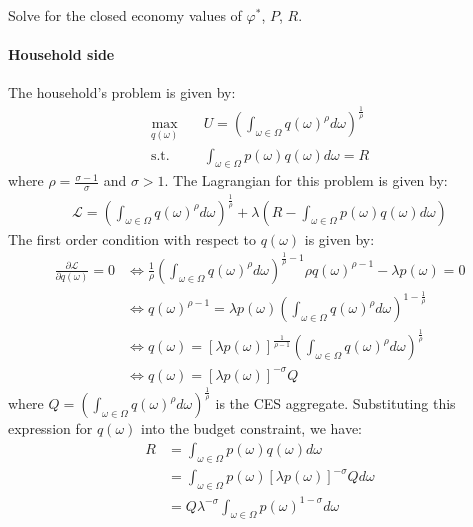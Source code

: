 Solve for the closed economy values of $\varphi^*$, $P$, $R$.

\begin{solution} \paragraph{Household side} The household's problem is given by:
    \begin{align*}
        \max_{q(\omega)} \quad & U = \left( \int_{\omega \in \Omega} q(\omega)^{\rho} d\omega \right)^{\frac{1}{\rho}} \\
        \text{s.t.} \quad & \int_{\omega \in \Omega} p(\omega) q(\omega) d\omega = R
    \end{align*}
    where $\rho = \frac{\sigma - 1}{\sigma}$ and $\sigma > 1$. The Lagrangian for this problem is given by:
    \begin{align*}
        \mathcal{L} = \left( \int_{\omega \in \Omega} q(\omega)^{\rho} d\omega \right)^{\frac{1}{\rho}} + \lambda \left( R - \int_{\omega \in \Omega} p(\omega) q(\omega) d\omega \right)
    \end{align*}
    The first order condition with respect to $q(\omega)$ is given by:
    \begin{align*}
        \frac{\partial \mathcal{L}}{\partial q(\omega)} = 0 &\iff \frac{1}{\rho} \left( \int_{\omega \in \Omega} q(\omega)^{\rho} d\omega \right)^{\frac{1}{\rho} - 1} \rho q(\omega)^{\rho - 1} - \lambda p(\omega) = 0 \\
        &\iff q(\omega)^{\rho - 1} = \lambda p(\omega) \left( \int_{\omega \in \Omega} q(\omega)^{\rho} d\omega \right)^{1 - \frac{1}{\rho}} \\
        &\iff q(\omega) = \left[ \lambda p(\omega) \right]^{\frac{1}{\rho - 1}} \left( \int_{\omega \in \Omega} q(\omega)^{\rho} d\omega \right)^{\frac{1}{\rho} } \\
        &\iff q(\omega) = \left[ \lambda p(\omega) \right]^{-\sigma} Q 
    \end{align*}
    where $Q = \left( \int_{\omega \in \Omega} q(\omega)^{\rho} d\omega \right)^{\frac{1}{\rho}}$ is the CES aggregate. Substituting this expression for $q(\omega)$ into the budget constraint, we have:
    \begin{align*}
        R &= \int_{\omega \in \Omega} p(\omega) q(\omega) d\omega \\
        &= \int_{\omega \in \Omega} p(\omega) \left[ \lambda p(\omega) \right]^{-\sigma} Q d\omega \\
        &= Q \lambda^{-\sigma} \int_{\omega \in \Omega} p(\omega)^{1 - \sigma} d\omega \\

\end{align*}
\end{solution}
